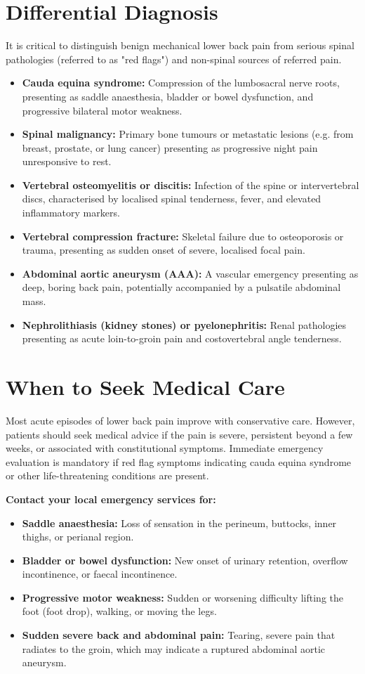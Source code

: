 \section*{Differential Diagnosis}
It is critical to distinguish benign mechanical lower back pain from serious spinal pathologies (referred to as "red flags") and non-spinal sources of referred pain.
\begin{itemize}
    \item \textbf{Cauda equina syndrome:} Compression of the lumbosacral nerve roots, presenting as saddle anaesthesia, bladder or bowel dysfunction, and progressive bilateral motor weakness.
    \item \textbf{Spinal malignancy:} Primary bone tumours or metastatic lesions (e.g. from breast, prostate, or lung cancer) presenting as progressive night pain unresponsive to rest.
    \item \textbf{Vertebral osteomyelitis or discitis:} Infection of the spine or intervertebral discs, characterised by localised spinal tenderness, fever, and elevated inflammatory markers.
    \item \textbf{Vertebral compression fracture:} Skeletal failure due to osteoporosis or trauma, presenting as sudden onset of severe, localised focal pain.
    \item \textbf{Abdominal aortic aneurysm (AAA):} A vascular emergency presenting as deep, boring back pain, potentially accompanied by a pulsatile abdominal mass.
    \item \textbf{Nephrolithiasis (kidney stones) or pyelonephritis:} Renal pathologies presenting as acute loin-to-groin pain and costovertebral angle tenderness.
\end{itemize}

\section*{When to Seek Medical Care}
Most acute episodes of lower back pain improve with conservative care. However, patients should seek medical advice if the pain is severe, persistent beyond a few weeks, or associated with constitutional symptoms. Immediate emergency evaluation is mandatory if red flag symptoms indicating cauda equina syndrome or other life-threatening conditions are present.

\textbf{Contact your local emergency services for:}
\begin{itemize}
    \item \textbf{Saddle anaesthesia:} Loss of sensation in the perineum, buttocks, inner thighs, or perianal region.
    \item \textbf{Bladder or bowel dysfunction:} New onset of urinary retention, overflow incontinence, or faecal incontinence.
    \item \textbf{Progressive motor weakness:} Sudden or worsening difficulty lifting the foot (foot drop), walking, or moving the legs.
    \item \textbf{Sudden severe back and abdominal pain:} Tearing, severe pain that radiates to the groin, which may indicate a ruptured abdominal aortic aneurysm.
\end{itemize}

